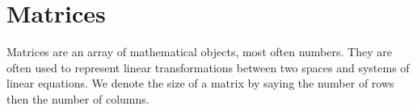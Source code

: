 \section{Matrices}
\noindent
Matrices are an array of mathematical objects, most often numbers. They are often used to represent linear transformations between two spaces and systems of linear equations. We denote the size of a matrix by saying the number of rows then the number of columns.






